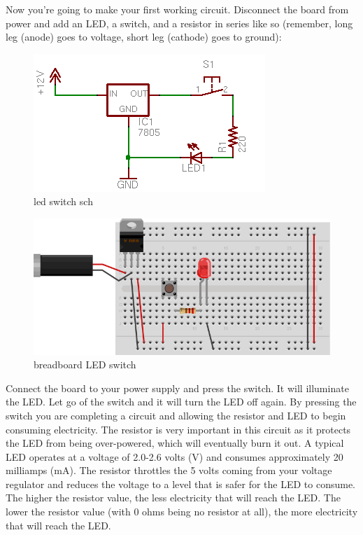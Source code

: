 Now you're going to make your first working circuit. Disconnect the board from power and add an LED, a switch, and a resistor in series like so (remember, long leg (anode) goes to voltage, short leg (cathode) goes to ground):

\begin{figure}[!htb]
 \centering
 \includegraphics[scale=0.8]{img/electronics/led_switch_sch.png}
 \caption{led switch sch}
 \label{led switch sch}
\end{figure}

\begin{figure}[!htb]
 \centering
 \includegraphics[scale=0.8]{img/electronics/breadboard_LED_switch.png}
 \caption{breadboard LED switch}
 \label{breadboard LED switch}
\end{figure}

Connect the board to your power supply and press the switch. It will illuminate the LED. Let go of the switch and it will turn the LED off again. By pressing the switch you are completing a circuit and allowing the resistor and LED to begin consuming electricity. The resistor is very important in this circuit as it protects the LED from being over-powered, which will eventually burn it out. A typical LED operates at a voltage of 2.0-2.6 volts (V) and consumes approximately 20 milliamps (mA). The resistor throttles the 5 volts coming from your voltage regulator and reduces the voltage to a level that is safer for the LED to consume. The higher the resistor value, the less electricity that will reach the LED. The lower the resistor value (with 0 ohms being no resistor at all), the more electricity that will reach the LED.

